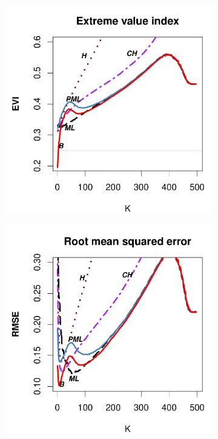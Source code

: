 \begin{figure}[h]
\begin{subfigure}[h]{0.40\linewidth}
		\end{subfigure}
		\bigskip
		\centering
		\begin{subfigure}[h]{0.40\linewidth}
			\includegraphics[width=\textwidth]{./plots/paper1/EVI_OutputGEV0,25500.pdf}
		\end{subfigure}
		\hspace{\fill}
		\begin{subfigure}[h]{0.40\linewidth}
			\includegraphics[width=\textwidth]{./plots/paper1/RMSE_OutputGEV0,25500.pdf}

\end{subfigure}
\end{figure}
